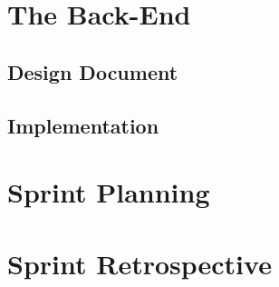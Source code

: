 \documentclass[12pt,onecolumn]{article}
\begin{document}
\section{The Back-End}

	\subsection{Design Document} %

	\subsection{Implementation} %

\section{Sprint Planning} %

\section{Sprint Retrospective} %
\end{document}
